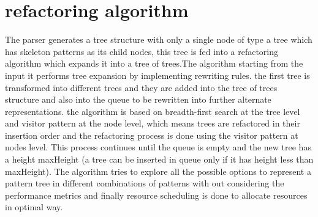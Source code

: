\documentclass[12pt]{report}
\begin{document}
\section{refactoring algorithm}
The parser generates a tree structure with only a single node of type a tree which has skeleton patterns as its child nodes, this tree is fed into a refactoring algorithm which expands it into a tree of trees.The algorithm starting from the input it performs tree expansion by implementing rewriting rules. the first tree is transformed into different trees and they are added into the tree of trees structure and also into the queue to be rewritten into further alternate representations. the algorithm is based on breadth-first search at the tree level and visitor pattern at the node level, which means trees are refactored in their insertion order and the refactoring process is done using the visitor pattern at nodes level.  This process continues until the queue is empty and the new tree has a height maxHeight (a tree can be inserted in queue only if it has height less than maxHeight).  The algorithm tries to explore all the possible options to represent a pattern tree in different combinations of patterns with out considering the performance metrics and finally resource scheduling is done to allocate resources in optimal way.
\end{document}
